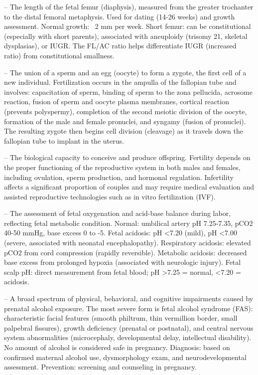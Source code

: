 -- The length of the fetal femur (diaphysis), measured from the greater trochanter to the distal femoral metaphysis. Used for dating (14-26 weeks) and growth assessment. Normal growth: ~2 mm per week. Short femur: can be constitutional (especially with short parents), associated with aneuploidy (trisomy 21, skeletal dysplasias), or IUGR. The FL/AC ratio helps differentiate IUGR (increased ratio) from constitutional smallness.

-- The union of a sperm and an egg (oocyte) to form a zygote, the first cell of a new individual. Fertilization occurs in the ampulla of the fallopian tube and involves: capacitation of sperm, binding of sperm to the zona pellucida, acrosome reaction, fusion of sperm and oocyte plasma membranes, cortical reaction (prevents polyspermy), completion of the second meiotic division of the oocyte, formation of the male and female pronuclei, and syngamy (fusion of pronuclei). The resulting zygote then begins cell division (cleavage) as it travels down the fallopian tube to implant in the uterus.

-- The biological capacity to conceive and produce offspring. Fertility depends on the proper functioning of the reproductive system in both males and females, including ovulation, sperm production, and hormonal regulation. Infertility affects a significant proportion of couples and may require medical evaluation and assisted reproductive technologies such as in vitro fertilization (IVF).

-- The assessment of fetal oxygenation and acid-base balance during labor, reflecting fetal metabolic condition. Normal: umbilical artery pH 7.25-7.35, pCO2 40-50 mmHg, base excess 0 to -5. Fetal acidosis: pH <7.20 (mild), pH <7.00 (severe, associated with neonatal encephalopathy). Respiratory acidosis: elevated pCO2 from cord compression (rapidly reversible). Metabolic acidosis: decreased base excess from prolonged hypoxia (associated with neurologic injury). Fetal scalp pH: direct measurement from fetal blood; pH >7.25 = normal, <7.20 = acidosis.

-- A broad spectrum of physical, behavioral, and cognitive impairments caused by prenatal alcohol exposure. The most severe form is fetal alcohol syndrome (FAS): characteristic facial features (smooth philtrum, thin vermillion border, small palpebral fissures), growth deficiency (prenatal or postnatal), and central nervous system abnormalities (microcephaly, developmental delay, intellectual disability). No amount of alcohol is considered safe in pregnancy. Diagnosis: based on confirmed maternal alcohol use, dysmorphology exam, and neurodevelopmental assessment. Prevention: screening and counseling in pregnancy.

